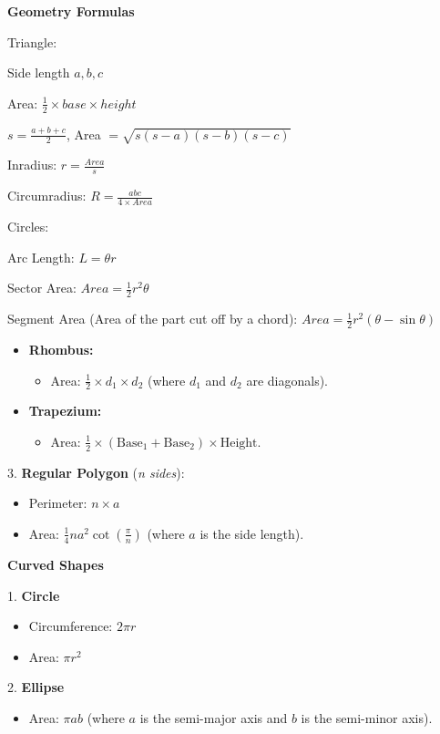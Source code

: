 \switchcolumn

\textbf{Geometry Formulas}

Triangle:

Side length $a, b, c$

Area: $\frac{1}{2} \times base \times height$

$s = \frac{a+b+c}{2}$, Area $= \sqrt{s(s-a)(s-b)(s-c)}$

Inradius: $r = \frac{Area}{s}$

Circumradius: $R = \frac{abc}{4 \times Area}$

Circles:

Arc Length: $L = \theta r$

Sector Area: $Area = \frac{1}{2} r^2 \theta$

Segment Area (Area of the part cut off by a chord): $Area = \frac{1}{2} r^2 (\theta - \sin\theta)$

\begin{itemize}
  \item \textbf{Rhombus:}
  \begin{itemize}
    \item Area: $\frac{1}{2} \times d_1 \times d_2$ (where $d_1$ and $d_2$ are diagonals).
  \end{itemize}
  \item \textbf{Trapezium:}
  \begin{itemize}
    \item Area: $\frac{1}{2} \times (\text{Base}_1 + \text{Base}_2) \times \text{Height}$.
  \end{itemize}
\end{itemize}
3. \textbf{Regular Polygon} (\textit{n sides}):
\begin{itemize}
  \item Perimeter: $n \times a$
  \item Area: $\frac{1}{4}na^2 \cot\!\left(\frac{\pi}{n}\right)$ (where $a$ is the side length).
\end{itemize}

\textbf{Curved Shapes}

1. \textbf{Circle}
\begin{itemize}
  \item Circumference: $2\pi r$
  \item Area: $\pi r^2$
\end{itemize}
2. \textbf{Ellipse}
\begin{itemize}
  \item Area: $\pi a b$ (where $a$ is the semi-major axis and $b$ is the semi-minor axis).
\end{itemize}

